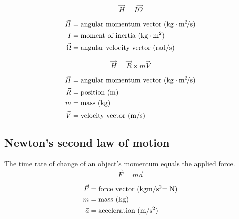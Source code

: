 \documentclass{article}
\begin{document}
\begin{multicols}{2}
\begin{equation*}
\boxed{\vec{H} = I\vec{\Omega}}
\end{equation*}

\begin{align*}
\vec{H} &= \text{angular momentum vector (\si{\kilo\gram\meter\squared\per\second})}\\
I &= \text{moment of inertia (\si{\kilo\gram\meter\squared})}\\
\vec{\Omega} &= \text{angular velocity vector (\si{\radian\per\second})}\\
\end{align*}

\vfill\null
\columnbreak

\begin{equation*}
\boxed{\vec{H} = \vec{R} \times m\vec{V}}
\end{equation*}

\begin{align*}
\vec{H} &= \text{angular momentum vector (\si{\kilo\gram\meter\squared\per\second})}\\
\vec{R} &= \text{position (\si{\meter})}\\
m &= \text{mass (\si{\kilo\gram})}\\
\vec{V} &= \text{velocity vector (\si{\meter\per\second})}\\
\end{align*}
\vfill\null
\end{multicols}

\subsection{Newton's second law of motion}
\begin{multicols}{2}
	The time rate of change of an object's momentum equals the applied force.
	\vfill\null
	\columnbreak
	\begin{equation*}
	\boxed{\vec{F} = m\vec{a}}
	\end{equation*}

	\begin{align*}
	\vec{F} &= \text{force vector (\si{\kilo\gram\meter\per\second\squared = \newton})}\\
	m &= \text{mass (\si{\kilo\gram})}\\
	\vec{a} &= \text{acceleration  (\si{\meter\per\second\squared})}\\
	\end{align*}
\end{multicols}
\end{document}
